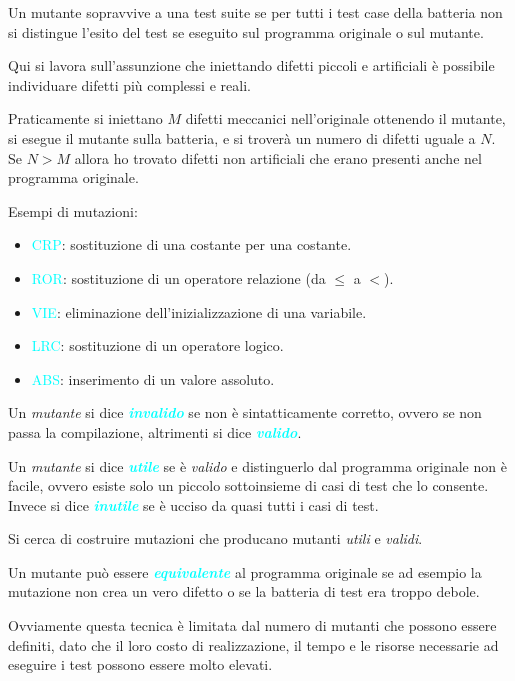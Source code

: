 Un mutante sopravvive a una test suite se per tutti i test case della batteria non si
distingue l'esito del test se eseguito sul programma originale o sul mutante.

Qui si lavora sull'assunzione che iniettando difetti piccoli e artificiali è
possibile individuare difetti più complessi e reali.

Praticamente si iniettano $M$ difetti meccanici nell'originale ottenendo il mutante,
si esegue il mutante sulla batteria, e si troverà un numero di difetti uguale a $N$.
Se $N > M$ allora ho trovato difetti non artificiali che erano presenti anche nel programma originale.

Esempi di mutazioni:
\begin{itemize}
    \item \textcolor{cyan}{CRP}: sostituzione di una costante per una costante.
    \item \textcolor{cyan}{ROR}: sostituzione di un operatore relazione (da $\leq$ a $<$).
    \item \textcolor{cyan}{VIE}: eliminazione dell'inizializzazione di una variabile.
    \item \textcolor{cyan}{LRC}: sostituzione di un operatore logico.
    \item \textcolor{cyan}{ABS}: inserimento di un valore assoluto.
\end{itemize}

Un \emph{mutante} si dice \textbf{\emph{\textcolor{cyan}{invalido}}} se non è
sintatticamente corretto, ovvero se non passa la compilazione, altrimenti si dice
\textbf{\emph{\textcolor{cyan}{valido}}}.

Un \emph{mutante} si dice \textbf{\emph{\textcolor{cyan}{utile}}} se è \emph{valido}
e distinguerlo dal programma originale non è facile, ovvero esiste solo un piccolo sottoinsieme
di casi di test che lo consente. Invece si dice \textbf{\emph{\textcolor{cyan}{inutile}}} se è
ucciso da quasi tutti i casi di test.

Si cerca di costruire mutazioni che producano mutanti \emph{utili} e \emph{validi}.

Un mutante può essere \textbf{\emph{\textcolor{cyan}{equivalente}}} al programma originale
se ad esempio la mutazione non crea un vero difetto o se la batteria di test era troppo debole.

Ovviamente questa tecnica è limitata dal numero di mutanti che possono essere definiti,
dato che il loro costo di realizzazione, il tempo e le risorse necessarie ad eseguire
i test possono essere molto elevati.

